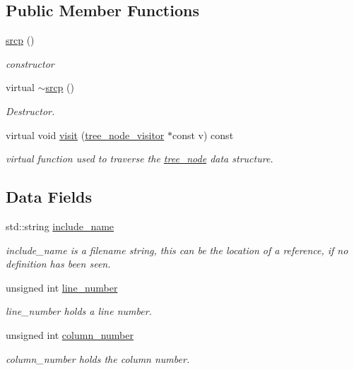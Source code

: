 \subsection*{Public Member Functions}
\begin{DoxyCompactItemize}
\item 
\hyperlink{structsrcp_acd3710ed7dc7212d9c362db1fd361f81}{srcp} ()
\begin{DoxyCompactList}\small\item\em constructor \end{DoxyCompactList}\item 
virtual \hyperlink{structsrcp_aa5ff584515aeb30cda33c01f58b2a02f}{$\sim$srcp} ()
\begin{DoxyCompactList}\small\item\em Destructor. \end{DoxyCompactList}\item 
virtual void \hyperlink{structsrcp_a1cd5943380f069e6ed0a33566af2566d}{visit} (\hyperlink{classtree__node__visitor}{tree\+\_\+node\+\_\+visitor} $\ast$const v) const
\begin{DoxyCompactList}\small\item\em virtual function used to traverse the \hyperlink{classtree__node}{tree\+\_\+node} data structure. \end{DoxyCompactList}\end{DoxyCompactItemize}
\subsection*{Data Fields}
\begin{DoxyCompactItemize}
\item 
std\+::string \hyperlink{structsrcp_aa9b1c535be5bf6dfd5934a8a1aa7ddab}{include\+\_\+name}
\begin{DoxyCompactList}\small\item\em include\+\_\+name is a filename string, this can be the location of a reference, if no definition has been seen. \end{DoxyCompactList}\item 
unsigned int \hyperlink{structsrcp_afcd6e053ca808ba23367bc53608f1771}{line\+\_\+number}
\begin{DoxyCompactList}\small\item\em line\+\_\+number holds a line number. \end{DoxyCompactList}\item 
unsigned int \hyperlink{structsrcp_a680f312ce457070fe3d698662d34e543}{column\+\_\+number}
\begin{DoxyCompactList}\small\item\em column\+\_\+number holds the column number. \end{DoxyCompactList}\end{DoxyCompactItemize}


